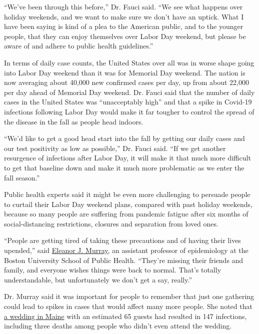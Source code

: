``We've been through this before,'' Dr. Fauci said. ``We see what
happens over holiday weekends, and we want to make sure we don't have an
uptick. What I have been saying is kind of a plea to the American
public, and to the younger people, that they can enjoy themselves over
Labor Day weekend, but please be aware of and adhere to public health
guidelines.''

In terms of daily case counts, the United States over all was in worse
shape going into Labor Day weekend than it was for Memorial Day weekend.
The nation is now averaging about 40,000 new confirmed cases per day, up
from about 22,000 per day ahead of Memorial Day weekend. Dr. Fauci said
that the number of daily cases in the United States was ``unacceptably
high'' and that a spike in Covid-19 infections following Labor Day would
make it far tougher to control the spread of the disease in the fall as
people head indoors.

``We'd like to get a good head start into the fall by getting our daily
cases and our test positivity as low as possible,'' Dr. Fauci said. ``If
we get another resurgence of infections after Labor Day, it will make it
that much more difficult to get that baseline down and make it much more
problematic as we enter the fall season.''

Public health experts said it might be even more challenging to persuade
people to curtail their Labor Day weekend plans, compared with past
holiday weekends, because so many people are suffering from pandemic
fatigue after six months of social-distancing restrictions, closures and
separation from loved ones.

``People are getting tired of taking these precautions and of having
their lives upended,'' said
\href{https://www.bu.edu/sph/profile/eleanor-murray/}{Eleanor J.
Murray,} an assistant professor of epidemiology at the Boston University
School of Public Health. ``They're missing their friends and family, and
everyone wishes things were back to normal. That's totally
understandable, but unfortunately we don't get a say, really.''

Dr. Murray said it was important for people to remember that just one
gathering could lead to spikes in cases that would affect many more
people. She noted that
\href{https://www.newscentermaine.com/article/news/health/coronavirus/maine-cdc-outbreaks-update-147-covid-19-cases-3-deaths-linked-to-millinocket-wedding/97-963b0e7f-af61-4bd2-98f9-8872c9b3ee47}{a
wedding in Maine} with an estimated 65 guests had resulted in 147
infections, including three deaths among people who didn't even attend
the wedding.

